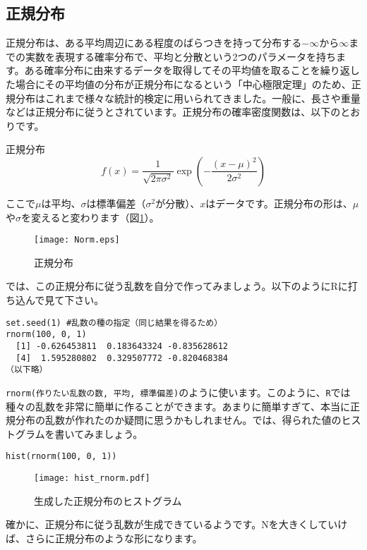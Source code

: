 \subsection{正規分布}
正規分布は、ある平均周辺にある程度のばらつきを持って分布する$-\infty$から$\infty$までの実数を表現する確率分布で、平均と分散という2つのパラメータを持ちます。ある確率分布に由来するデータを取得してその平均値を取ることを繰り返した場合にその平均値の分布が正規分布になるという「中心極限定理」のため、正規分布はこれまで様々な統計的検定に用いられてきました。一般に、長さや重量などは正規分布に従うとされています。正規分布の確率密度関数は、以下のとおりです。
\begin{itembox}[l]{正規分布}
\begin{equation}
f(x) = \dfrac{1}{\sqrt{2\pi\sigma^{2}}}\exp(-\dfrac{(x - \mu)^{2}}{2\sigma^{2}})
\end{equation}
\end{itembox}
ここで$\mu$は平均、$\sigma$は標準偏差（$\sigma^2$が分散）、$x$はデータです。正規分布の形は、$\mu$や$\sigma$を変えると変わります（図\ref{Norm}）。
\begin{figure}[htb]
\begin{center}
\graphicspath{{3_glm/figs/}}
\texttt{[image: Norm.eps]}\\
\caption{正規分布}
\label{Norm}
\end{center}
\end{figure}

では、この正規分布に従う乱数を自分で作ってみましょう。以下のようにRに打ち込んで見て下さい。
\begin{verbatim}
set.seed(1) #乱数の種の指定（同じ結果を得るため）
rnorm(100, 0, 1)
  [1] -0.626453811  0.183643324 -0.835628612
  [4]  1.595280802  0.329507772 -0.820468384
（以下略）
\end{verbatim}
\verb|rnorm(作りたい乱数の数, 平均, 標準偏差)|のように使います。このように、\verb|R|では種々の乱数を非常に簡単に作ることができます。あまりに簡単すぎて、本当に正規分布の乱数が作れたのか疑問に思うかもしれません。では、得られた値のヒストグラムを書いてみましょう。
\begin{verbatim}
hist(rnorm(100, 0, 1))
\end{verbatim}
\begin{figure}[htb]
\begin{center}
\graphicspath{{3_glm/figs/}}
\texttt{[image: hist\_rnorm.pdf]}\\
\caption{生成した正規分布のヒストグラム}
\label{hist_rnorm}
\end{center}
\end{figure}
確かに、正規分布に従う乱数が生成できているようです。Nを大きくしていけば、さらに正規分布のような形になります。

